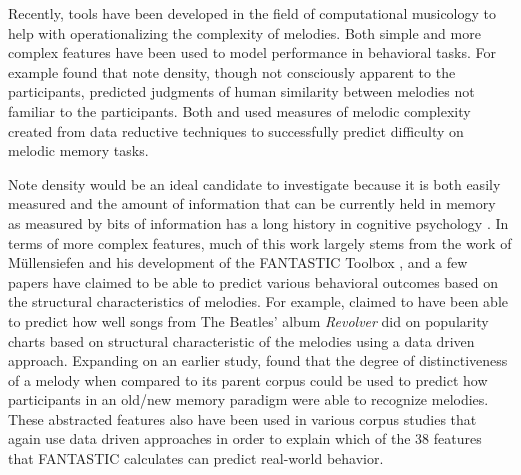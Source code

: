 \documentclass[12pt,]{book}
\begin{document}
Recently, tools have been developed in the field of computational musicology to help with operationalizing the complexity of melodies.
Both simple and more complex features have been used to model performance in behavioral tasks.
For example \citet{eerolaPerceivedComplexityWestern2006} found that note density, though not consciously apparent to the participants, predicted judgments of human similarity between melodies not familiar to the participants.
Both \citet{harrisonModellingMelodicDiscrimination2016} and \citet{bakerPerceptionLeitmotivesRichard2017} used measures of melodic complexity created from data reductive techniques to successfully predict difficulty on melodic memory tasks.

Note density would be an ideal candidate to investigate because it is both easily measured and the amount of information that can be currently held in memory as measured by bits of information has a long history in cognitive psychology \citep{cowanWorkingMemoryCapacity2005, millerInformationMemory1956, pearceStatisticalLearningProbabilistic2018a}.
In terms of more complex features, much of this work largely stems from the work of Müllensiefen and his development of the FANTASTIC Toolbox \citeyearpar{mullensiefenFantasticFeatureANalysis2009}, and a few papers have claimed to be able to predict various behavioral outcomes based on the structural characteristics of melodies.
For example, \citep{kopiezAufSucheNach2011} claimed to have been able to predict how well songs from The Beatles' album \emph{Revolver} did on popularity charts based on structural characteristic of the melodies using a data driven approach.
Expanding on an earlier study, \citet{mullensiefenRoleFeaturesContext2014} found that the degree of distinctiveness of a melody when compared to its parent corpus could be used to predict how participants in an old/new memory paradigm were able to recognize melodies.
These abstracted features also have been used in various corpus studies \citep{jakubowskiDissectingEarwormMelodic2017, janssenPredictingVariationFolk2017, rainsfordDistinctivenessEffectRecognition2019, rainsfordMUSOSMUsicSOftware2018}
that again use data driven approaches in order to explain which of the 38 features that FANTASTIC calculates can predict real-world behavior.
\end{document}
